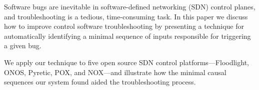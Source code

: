 Software bugs are inevitable in software-defined networking (SDN) control planes,
and troubleshooting
is a tedious, time-consuming task. In this paper we discuss how to improve
control software troubleshooting by presenting a technique
for automatically identifying
a minimal sequence of inputs responsible for triggering a given bug.

We apply our technique to \num{five} open source SDN control
platforms---Floodlight, ONOS, Pyretic, POX, and NOX---and
illustrate how the minimal causal sequences our system found aided the
troubleshooting process.
